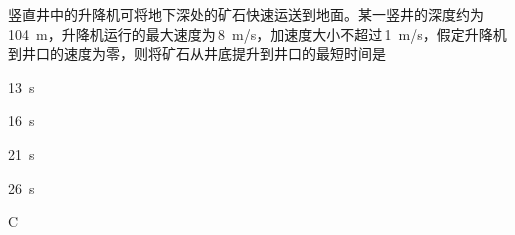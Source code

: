 竖直井中的升降机可将地下深处的矿石快速运送到地面。某一竖井的深度约为\,\qty{104}{m}，升降机运行的最大速度为\,\qty{8}{m/s}，加速度大小不超过\,\qty{1}{m/s}，假定升降机到井口的速度为零，则将矿石从井底提升到井口的最短时间是\paren[C]
\begin{choices}
    \item \qty{13}{s}
    \item \qty{16}{s}
    \item \qty{21}{s}
    \item \qty{26}{s}
\end{choices}
\begin{answer}
    C
\end{answer}